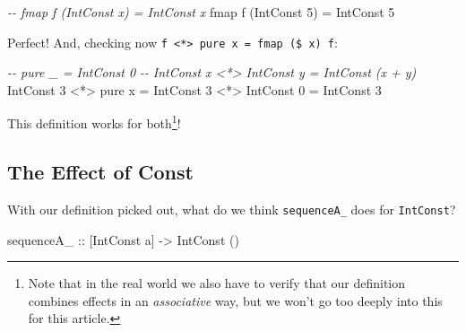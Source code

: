 \documentclass[]{article}
\newenvironment{Shaded}{}{}
\newcommand{\CommentTok}[1]{\textcolor[rgb]{0.38,0.63,0.69}{\textit{#1}}}
\newcommand{\DataTypeTok}[1]{\textcolor[rgb]{0.56,0.13,0.00}{#1}}
\newcommand{\DecValTok}[1]{\textcolor[rgb]{0.25,0.63,0.44}{#1}}
\newcommand{\FunctionTok}[1]{\textcolor[rgb]{0.02,0.16,0.49}{#1}}
\newcommand{\NormalTok}[1]{#1}
\newcommand{\OperatorTok}[1]{\textcolor[rgb]{0.40,0.40,0.40}{#1}}
\newcommand{\OtherTok}[1]{\textcolor[rgb]{0.00,0.44,0.13}{#1}}
\begin{document}
\begin{Shaded}
\begin{Highlighting}[]
\CommentTok{{-}{-} fmap f (IntConst x) = IntConst x}
\FunctionTok{fmap}\NormalTok{ f (}\DataTypeTok{IntConst} \DecValTok{5}\NormalTok{) }\OtherTok{=} \DataTypeTok{IntConst} \DecValTok{5}
\end{Highlighting}
\end{Shaded}

Perfect! And, checking now
\texttt{f\ \textless{}*\textgreater{}\ pure\ x\ =\ fmap\ (\$\ x)\ f}:

\begin{Shaded}
\begin{Highlighting}[]
\CommentTok{{-}{-} pure \_                    = IntConst 0}
\CommentTok{{-}{-} IntConst x <*> IntConst y = IntConst (x + y)}
\DataTypeTok{IntConst} \DecValTok{3} \OperatorTok{<*>} \FunctionTok{pure}\NormalTok{ x }\OtherTok{=} \DataTypeTok{IntConst} \DecValTok{3} \OperatorTok{<*>} \DataTypeTok{IntConst} \DecValTok{0}
                      \OtherTok{=} \DataTypeTok{IntConst} \DecValTok{3}
\end{Highlighting}
\end{Shaded}

\begin{Shaded}
\end{Shaded}

This definition works for both\footnote{Note that in the real world we also have
  to verify that our definition combines effects in an \emph{associative} way,
  but we won't go too deeply into this for this article.}!

\hypertarget{the-effect-of-const}{%
\subsection{The Effect of Const}\label{the-effect-of-const}}

With our definition picked out, what do we think \texttt{sequenceA\_} does for
\texttt{IntConst}?

\begin{Shaded}
\begin{Highlighting}[]
\OtherTok{sequenceA\_ ::}\NormalTok{ [}\DataTypeTok{IntConst}\NormalTok{ a] }\OtherTok{{-}>} \DataTypeTok{IntConst}\NormalTok{ ()}
\end{Highlighting}
\end{Shaded}
\end{document}
